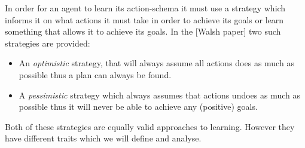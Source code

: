 \documentclass[master.tex]{subfiles}
\begin{document}
    In order for an agent to learn its action-schema it must use a strategy
    which informs it on what actions it must take in order to achieve
    its goals or learn something that allows it to achieve its goals.
    In the {[}Walsh paper{]} two such strategies are provided:
    \begin{itemize}
    \item An \emph{optimistic} strategy, that will always assume all actions
    does as much as possible thus a plan can always be found.
    \item A \emph{pessimistic} strategy which always assumes that actions undoes
    as much as possible thus it will never be able to achieve any (positive)
    goals.
    \end{itemize}
    Both of these strategies are equally valid approaches to learning.
    However they have different traits which we will define and analyse.
\end{document}
